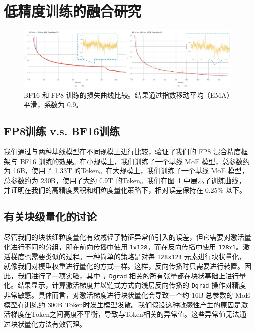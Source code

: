 \documentclass[lang=cn,a4paper,newtx]{elegantpaper}
\begin{document}
\section{低精度训练的融合研究}
\label{app:fp8}

\begin{figure}[!h]
\centering
\includegraphics[width=0.95\linewidth]{figures/fp8-v.s.-bf16-repaired.pdf}
\caption{BF16 和 FP8 训练的损失曲线比较。结果通过指数移动平均（EMA）平滑，系数为 0.9。}
\label{fig:fp8_vs_bf16}
\end{figure}

\subsection{FP8训练 v.s. BF16训练}
\label{app:fp8_cp_bf16}

我们通过与两种基线模型在不同规模上进行比较，验证了我们的 FP8 混合精度框架与 BF16 训练的效果。在小规模上，我们训练了一个基线 MoE 模型，总参数约为 16B，使用了 1.33T 的Token。在大规模上，我们训练了一个基线 MoE 模型，总参数约为 230B，使用了大约 0.9T 的Token。我们在图~\ref{fig:fp8_vs_bf16} 中展示了训练曲线，并证明在我们的高精度累积和细粒度量化策略下，相对误差保持在 0.25\% 以下。

\subsection{有关块级量化的讨论}
\label{app:fp8_blockwise}

尽管我们的块状细粒度量化有效减轻了特征异常值引入的误差，但它需要对激活量化进行不同的分组，即在前向传播中使用 \texttt{1x128}，而在反向传播中使用 \texttt{128x1}。激活梯度也需要类似的过程。一种简单的策略是对每 \texttt{128x128} 元素进行块状量化，就像我们对模型权重进行量化的方式一样。这样，反向传播时只需要进行转置。因此，我们进行了一项实验，其中与 \texttt{Dgrad} 相关的所有张量都在块状基础上进行量化。结果显示，计算激活梯度并以链式方式向浅层反向传播的 \texttt{Dgrad} 操作对精度非常敏感。具体而言，对激活梯度进行块状量化会导致一个约 16B 总参数的 MoE 模型在训练约 300B Token时发生模型发散。我们假设这种敏感性产生的原因是激活梯度在Token之间高度不平衡，导致与Token相关的异常值。这些异常值无法通过块状量化方法有效管理。
\end{document}
